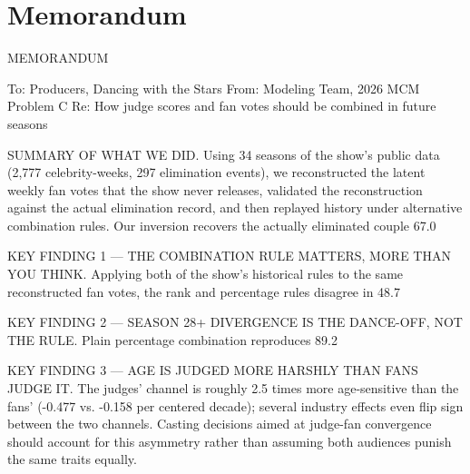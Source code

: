 \clearpage
\section*{Memorandum}
MEMORANDUM

To: Producers, Dancing with the Stars
From: Modeling Team, 2026 MCM Problem C
Re: How judge scores and fan votes should be combined in future seasons

SUMMARY OF WHAT WE DID. Using 34 seasons of the show's public data (2,777 celebrity-weeks, 297 elimination events), we reconstructed the latent weekly fan votes that the show never releases, validated the reconstruction against the actual elimination record, and then replayed history under alternative combination rules. Our inversion recovers the actually eliminated couple 67.0%

KEY FINDING 1 — THE COMBINATION RULE MATTERS, MORE THAN YOU THINK. Applying both of the show's historical rules to the same reconstructed fan votes, the rank and percentage rules disagree in 48.7%

KEY FINDING 2 — SEASON 28+ DIVERGENCE IS THE DANCE-OFF, NOT THE RULE. Plain percentage combination reproduces 89.2%

KEY FINDING 3 — AGE IS JUDGED MORE HARSHLY THAN FANS JUDGE IT. The judges' channel is roughly 2.5 times more age-sensitive than the fans' (-0.477 vs. -0.158 per centered decade); several industry effects even flip sign between the two channels. Casting decisions aimed at judge-fan convergence should account for this asymmetry rather than assuming both audiences punish the same traits equally.

